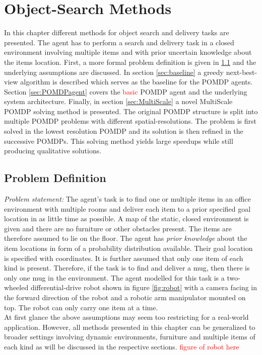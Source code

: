 \chapter{Object-Search Methods}
\label{sec:object_search}
In this chapter different methods for object search and delivery tasks are presented. The agent has to perform a search and delivery task in a closed environment involving multiple items and with prior uncertain knowledge about the items location. First, a more formal problem definition is given in \ref{sec:problemdef} and the underlying assumptions are discussed. In section \ref{sec:baseline} a greedy next-best-view algorithm is described which serves as the baseline for the POMDP agents. Section \ref{sec:POMDPagent} covers the \textcolor{red}{basic} POMDP agent and the underlying system architecture. Finally, in section \ref{sec:MultiScale} a novel MultiScale POMDP solving method is presented. The original POMDP structure is split into multiple POMDP problems with different spatial-resolutions. The problem is first solved in the lowest resolution POMDP and its solution is then refined in the successive POMDPs. This solving method yields large speedups while still producing qualitative solutions.  

\section{Problem Definition}\label{sec:problemdef}
\textit{Problem statement:} 
The agent's task is to find one or multiple items in an office environment with multiple rooms and deliver each item to a prior specified goal location in as little time as possible. A map of the static, closed environment is given and there are no furniture or other obstacles present. The items are therefore assumed to lie on the floor. The agent has \textit{prior knowledge} about the item locations in form of a probability distribution available. Their goal location is specified with coordinates. It is further assumed that only one item of each kind is present. Therefore, if the task is to find and deliver a mug, then there is only one mug in the environment. The agent modelled for this task is a two-wheeled differential-drive robot shown in figure \ref{fig:robot} with a camera facing in the forward direction of the robot and a robotic arm manipulator mounted on top. The robot can only carry one item at a time.\\

At first glance the above assumptions may seem too restricting for a real-world application. However, all methods presented in this chapter can be generalized to broader settings involving dynamic environments, furniture and multiple items of each kind as will be discussed in the respective sections. \textcolor{red}{figure of robot here}
